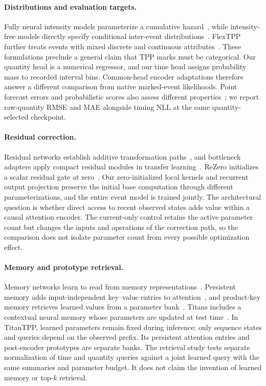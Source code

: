 \documentclass[runningheads]{llncs}
\newcommand{\method}{TitanTPP}
\begin{document}
\paragraph{Distributions and evaluation targets.}
Fully neural intensity models parameterize a cumulative hazard~\cite{omi2019fully}, while intensity-free models directly specify conditional inter-event distributions~\cite{shchur2020intensityfree}. FlexTPP further treats events with mixed discrete and continuous attributes~\cite{draxler2025flextpp}. These formulations preclude a general claim that TPP marks must be categorical. Our quantity head is a numerical regressor, and our time head assigns probability mass to recorded interval bins. Common-head encoder adaptations therefore answer a different comparison from native marked-event likelihoods. Point forecast errors and probabilistic scores also assess different properties~\cite{hyndman2006accuracy,gneiting2007proper}; we report raw-quantity RMSE and MAE alongside timing NLL at the same quantity-selected checkpoint.

\paragraph{Residual correction.}
Residual networks establish additive transformation paths~\cite{he2016residual}, and bottleneck adapters apply compact residual modules in transfer learning~\cite{houlsby2019adapters}. ReZero initializes a scalar residual gate at zero~\cite{bachlechner2021rezero}. Our zero-initialized local kernels and recurrent output projection preserve the initial base computation through different parameterizations, and the entire event model is trained jointly. The architectural question is whether direct access to recent observed states adds value within a causal attention encoder. The current-only control retains the active parameter count but changes the inputs and operations of the correction path, so the comparison does not isolate parameter count from every possible optimization effect.

\paragraph{Memory and prototype retrieval.}
Memory networks learn to read from memory representations~\cite{sukhbaatar2015memory}. Persistent memory adds input-independent key--value entries to attention~\cite{sukhbaatar2019memory}, and product-key memory retrieves learned values from a parameter bank~\cite{lample2019product}. Titans includes a contextual neural memory whose parameters are updated at test time~\cite{behrouz2025titans}. In \method, learned parameters remain fixed during inference; only sequence states and queries depend on the observed prefix. Its persistent attention entries and post-encoder prototypes are separate banks. The retrieval study tests separate normalization of time and quantity queries against a joint learned query with the same summaries and parameter budget. It does not claim the invention of learned memory or top-$k$ retrieval.
\end{document}
